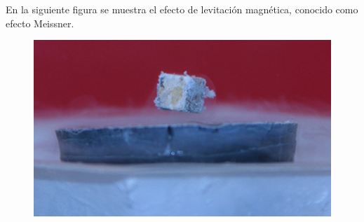 \documentclass[12pt]{article}
\begin{document}
En la siguiente figura se muestra el efecto de levitación magnética, conocido como efecto Meissner.
\begin{figure}[H]
    \centering
    \includegraphics[scale=1.5]{Imagenes/Superconductividad_02.jpg}
\end{figure}
\end{document}
